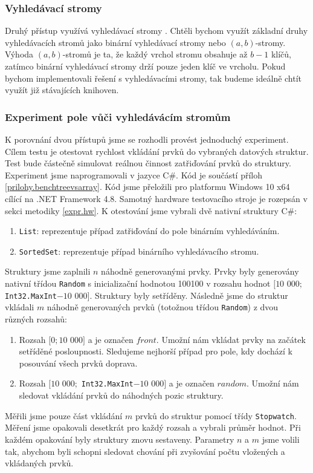 \subsubsection{Vyhledávací stromy}

Druhý přístup využívá vyhledávací stromy \citep[str. 177]{labyrint}.
Chtěli bychom využít základní druhy vyhledávacích stromů jako binární vyhledávací stromy nebo $(a, b)$-stromy.
Výhoda $(a, b)$-stromů je ta, že každý vrchol stromu obsahuje až $b-1$ klíčů, zatímco binární vyhledávací stromy drží pouze jeden klíč ve vrcholu.
Pokud bychom implementovali řešení s vyhledávacími stromy, tak budeme ideálně chtít využít již stávajících knihoven.

\subsubsection{Experiment pole vůči vyhledávácím stromům}

K porovnání dvou přístupů jsme se rozhodli provést jednoduchý experiment.
Cílem testu je otestovat rychlost vkládání prvků do vybraných datových struktur.
Test bude částečně simulovat reálnou činnost zatřiďování prvků do struktury.
Experiment jsme naprogramovali v jazyce C\#.
Kód je součástí příloh \ref{prilohy.benchtreevsarray}.
Kód jsme přeložili pro platformu Windows 10 x64 cílící na .NET Framework 4.8.
Samotný hardware testovacího stroje je rozepsán v sekci metodiky \ref{expr.hw}.
K otestování jsme vybrali dvě nativní struktury C\#:

\begin{enumerate}
\item \texttt{List}: reprezentuje případ zatřiďování do pole binárním vyhledáváním.
\item \texttt{SortedSet}: reprezentuje případ binárního vyhledávacího stromu.
\end{enumerate}
Struktury jsme zaplnili $n$ náhodně generovanými prvky.
Prvky byly generovány nativní třídou \texttt{Random} s inicializační hodnotou 100100 v rozsahu hodnot $[10$ $000; $\texttt{Int32.MaxInt}$ - 10$ $000]$.
Struktury byly setříděny.
Následně jsme do struktur vkládali $m$ náhodně generovaných prvků (totožnou třídou \texttt{Random}) z dvou různých rozsahů:

\begin{enumerate}
\item Rozsah $[0; 10$ $000]$ a je označen $front$. 
Umožní nám vkládat prvky na začátek setříděné posloupnosti. 
Sledujeme nejhorší případ pro pole, kdy dochází k posouvání všech prvků doprava.
\item Rozsah $[10$ $000;$ \texttt{Int32.MaxInt}$ - 10$ $000]$ a je označen $random$.
Umožní nám sledovat vkládání prvků do náhodných pozic struktury.
\end{enumerate}
Měřili jsme pouze část vkládání $m$ prvků do struktur pomocí třídy \texttt{Stopwatch}.
Měření jsme opakovali desetkrát pro každý rozsah a vybrali průměr hodnot.
Při každém opakování byly struktury znovu sestaveny.
Parametry $n$ a $m$ jsme volili tak, abychom byli schopni sledovat chování při zvyšování počtu vložených a vkládaných prvků. 

